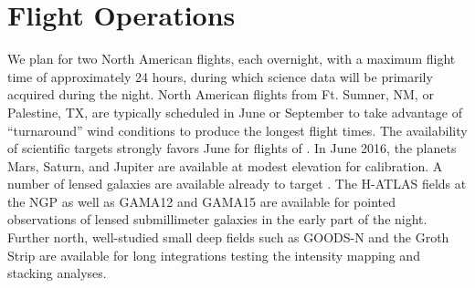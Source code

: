 \section{Flight Operations}
\label{sec:FlightOperations}

We plan for two North American flights, each overnight, with a maximum flight time of approximately 24 hours, during which science data will be primarily acquired during the night.  North American flights from Ft. Sumner, NM, or Palestine, TX, are typically scheduled in June or September to take advantage of ``turnaround'' wind conditions to produce the longest flight times.  The availability of scientific targets strongly favors June for flights of \name. In June 2016, the planets Mars, Saturn, and Jupiter are available at modest elevation for calibration.  A number of lensed galaxies are available already to target \citep{gonzalez_nuevo12,casey12}.  The H-ATLAS fields at the NGP as well as GAMA12 and GAMA15 are available for pointed observations of lensed submillimeter galaxies in the early part of the night.  Further north, well-studied small deep fields such as GOODS-N and the Groth Strip are available for long integrations testing the intensity mapping and stacking analyses.



